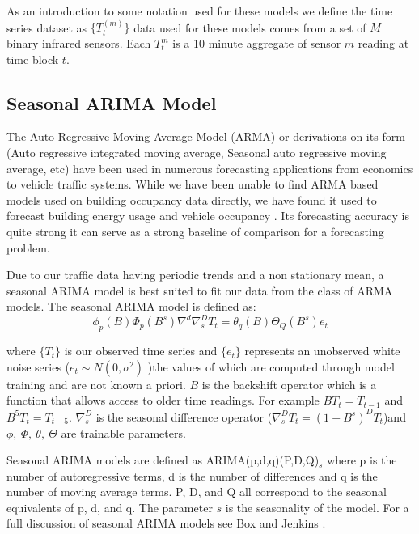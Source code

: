 \documentclass{acm_proc_article-sp}
\begin{document}
As an introduction to some notation used for these models we define the time series dataset as $\{T_{t}^{(m)}\}$ data used for these models comes from a set of $M$ binary infrared sensors.  Each $T_{t}^{m}$ is a 10 minute aggregate of sensor $m$ reading at time block $t$.  

\subsection{Seasonal ARIMA Model}
The Auto Regressive Moving Average Model (ARMA) or derivations on its form (Auto regressive integrated moving average, Seasonal auto regressive moving average, etc) have been used in numerous forecasting applications from economics to vehicle traffic systems.  While we have been unable to find ARMA based models used on building occupancy data directly, we have found it used to forecast building energy usage and vehicle occupancy \cite{Williams2003, Hong2011, Newsham2010}.  Its forecasting accuracy is quite strong it can serve as a strong baseline of comparison for a forecasting problem.  

Due to our traffic data having periodic trends and a non stationary mean, a seasonal ARIMA model is best suited to fit our data from the class of ARMA models.  The seasonal ARIMA model is defined as:
\begin{equation}
\label{eq:sarima}
\phi_{p}(B)\Phi_{p}(B^{s})\nabla^{d}\nabla^{D}_{s}T_{t} = \theta_{q}(B)\Theta_{Q}(B^{s})e_{t}
\end{equation}

\noindent
where $\{T_{t}\}$ is our observed time series and $\{e_t\}$ represents an unobserved white noise series ($e_{t} \sim N(0, \sigma^{2})$ )the values of which are computed through model training and are not known a priori.  $B$ is the backshift operator which is a function that allows access to older time readings.  For example $BT_{t} = T_{t-1}$ and $B^{5}T_{t} = T_{t-5}$.  $\nabla^{D}_{s}$ is the seasonal difference operator ($\nabla^{D}_{s}T_{t} = (1 - B^{s})^{D}T_{t}$)and $\phi,\  \Phi,\  \theta,\ \Theta$ are trainable parameters.  

Seasonal ARIMA models are defined as \newline ARIMA(p,d,q)(P,D,Q)$_{s}$ where p is the number of autoregressive terms, d is the number of differences and q is the number of moving average terms.  P, D, and Q all correspond to the seasonal equivalents of p, d, and q.  The parameter $s$ is the seasonality of the model.  For a full discussion of seasonal ARIMA models see Box and Jenkins \cite{Box2008}. \newline
\end{document}
